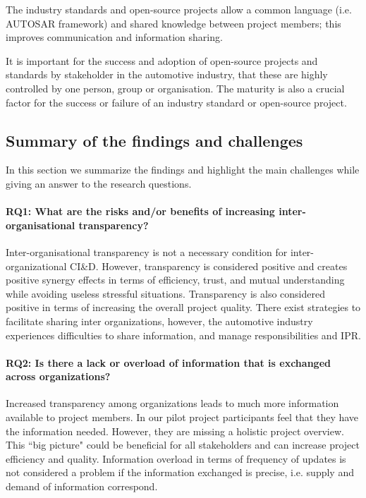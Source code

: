  The industry standards and open-source projects allow a common language (i.e. AUTOSAR framework) and shared knowledge between project members; this improves communication and information sharing.

 It is important for the success and adoption of open-source projects and standards by stakeholder in the automotive industry, that these are highly controlled by one person, group or organisation. The maturity is also a crucial factor for the success or failure of an industry standard or open-source project.



\subsection{Summary of the findings and challenges}\label{sec:findings_RQs}

In this section we summarize the findings and highlight the main challenges while giving an answer to the research questions.


\paragraph*{RQ1: What are the risks and/or benefits of increasing inter-organisational transparency?} Inter-organisational transparency is not a necessary condition for inter-organizational CI\&D. However, transparency is considered positive and creates positive synergy effects in terms of efficiency, trust, and mutual understanding while avoiding useless stressful situations. Transparency is also considered positive in terms of increasing the overall project quality. 
There exist strategies to facilitate sharing inter organizations, however, the automotive industry experiences difficulties to share information, and manage responsibilities and IPR.
\paragraph*{RQ2: Is there a lack or overload of information that is exchanged across organizations?}  Increased transparency among organizations leads to much more information available to project members. In our pilot project participants feel that they have the information needed. However, they are missing a holistic project overview. This ``big picture" could be beneficial for all stakeholders and can increase project efficiency and quality. Information overload in terms of frequency of updates is not considered a problem if the information exchanged is precise, i.e. supply and demand of information correspond.
